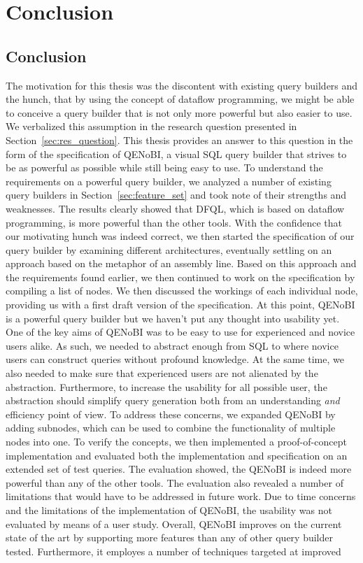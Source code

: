\documentclass[11pt,a4paper]{globis-book}
\begin{document}

\chapter{Conclusion}
\label{ch:conclusion}

\section{Conclusion}
\label{sec:conclusion}
The motivation for this thesis was the discontent with existing query builders and the hunch, that by using the concept of dataflow programming, we might be able to conceive a query builder that is not only more powerful but also easier to use. We verbalized this assumption in the research question presented in Section~\ref{sec:res_question}. This thesis provides an answer to this question in the form of the specification of QENoBI, a visual SQL query builder that strives to be as powerful as possible while still being easy to use. To understand the requirements on a powerful query builder, we analyzed a number of existing query builders in Section~\ref{sec:feature_set} and took note of their strengths and weaknesses. The results clearly showed that DFQL, which is based on dataflow programming, is more powerful than the other tools. With the confidence that our motivating hunch was indeed correct, we then started the specification of our query builder by examining different architectures, eventually settling on an approach based on the metaphor of an assembly line. Based on this approach and the requirements found earlier, we then continued to work on the specification by compiling a list of nodes. We then discussed the workings of each individual node, providing us with a first draft version of the specification. At this point, QENoBI is a powerful query builder but we haven't put any thought into usability yet. One of the key aims of QENoBI was to be easy to use for experienced and novice users alike. As such, we needed to abstract enough from SQL to where novice users can construct queries without profound knowledge. At the same time, we also needed to make sure that experienced users are not alienated by the abstraction. Furthermore, to increase the usability for all possible user, the abstraction should simplify query generation both from an understanding \emph{and} efficiency point of view. To address these concerns, we expanded QENoBI by adding subnodes, which can be used to combine the functionality of multiple nodes into one. To verify the concepts, we then implemented a proof-of-concept implementation and evaluated both the implementation and specification on an extended set of test queries. The evaluation showed, the QENoBI is indeed more powerful than any of the other tools. The evaluation also revealed a number of limitations that would have to be addressed in future work. Due to time concerns and the limitations of the implementation of QENoBI, the usability was not evaluated by means of a user study. Overall, QENoBI improves on the current state of the art by supporting more features than any of other query builder tested. Furthermore, it employes a number of techniques targeted at improved 
\end{document}

